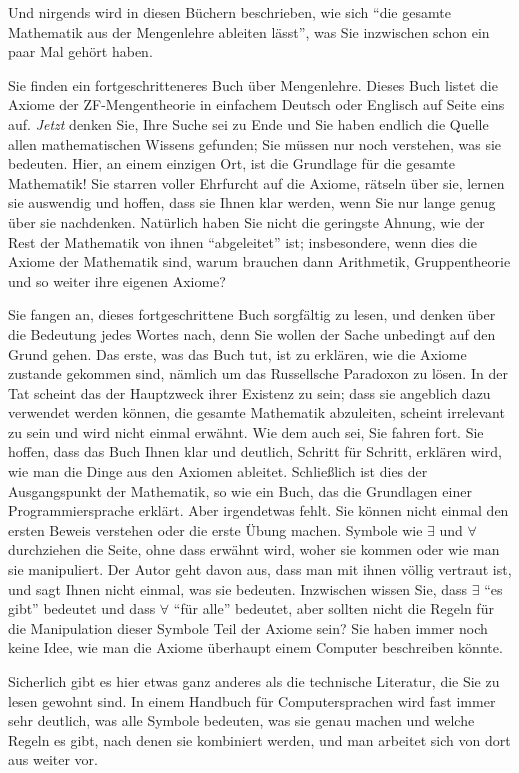 Und nirgends wird in diesen Büchern beschrieben, wie sich "`die gesamte Mathematik aus der Mengenlehre ableiten lässt"', was Sie inzwischen schon ein paar Mal gehört haben.

Sie finden ein fortgeschritteneres Buch über Mengenlehre.  Dieses Buch listet die
Axiome der ZF-Mengentheorie in einfachem Deutsch oder Englisch auf Seite eins auf.  {\em Jetzt} denken Sie, Ihre Suche sei zu Ende und Sie haben endlich die Quelle allen mathematischen Wissens gefunden; Sie müssen nur noch verstehen, was sie bedeuten.  Hier, an einem einzigen Ort, ist die Grundlage für die gesamte Mathematik!  Sie starren voller Ehrfurcht auf die Axiome, rätseln über sie, lernen sie auswendig und hoffen, dass sie Ihnen klar werden, wenn Sie nur lange genug über sie nachdenken.  Natürlich haben Sie nicht die geringste Ahnung, wie der Rest der Mathematik von ihnen "`abgeleitet"' ist; insbesondere, wenn dies die Axiome der Mathematik sind, warum brauchen dann Arithmetik, Gruppentheorie und so weiter ihre eigenen Axiome?
	
Sie fangen an, dieses fortgeschrittene Buch sorgfältig zu lesen, und denken über die Bedeutung jedes Wortes nach, denn Sie wollen der Sache unbedingt auf den Grund gehen.
Das erste, was das Buch tut, ist zu erklären, wie die Axiome zustande gekommen sind, nämlich um das Russellsche Paradoxon zu lösen.  In der Tat scheint das der Hauptzweck ihrer Existenz zu sein; dass sie angeblich dazu verwendet werden können, die gesamte Mathematik abzuleiten, scheint irrelevant zu sein und wird nicht einmal erwähnt.  Wie dem auch sei, Sie fahren fort.  Sie hoffen, dass das Buch Ihnen klar und deutlich, Schritt für Schritt, erklären wird, wie man die Dinge aus den Axiomen ableitet.  Schließlich ist dies der Ausgangspunkt der Mathematik, so wie ein Buch, das die Grundlagen einer Programmiersprache erklärt.  Aber irgendetwas fehlt.  Sie können nicht einmal den ersten Beweis verstehen oder die erste Übung machen.  Symbole wie $\exists$ und $\forall$ durchziehen die Seite, ohne dass erwähnt wird, woher sie kommen oder wie man sie manipuliert. Der Autor geht davon aus, dass man mit ihnen völlig vertraut ist, und sagt Ihnen nicht einmal, was sie bedeuten.  Inzwischen wissen Sie, dass $\exists$ "`es gibt"' bedeutet und dass $\forall$ "`für alle"' bedeutet, aber sollten nicht die Regeln für die Manipulation dieser Symbole Teil der Axiome sein?  Sie haben immer noch keine Idee, wie man die Axiome überhaupt einem Computer beschreiben könnte.
	
Sicherlich gibt es hier etwas ganz anderes als die technische Literatur, die Sie zu lesen gewohnt sind.  In einem Handbuch für Computersprachen wird fast immer sehr deutlich, was alle Symbole bedeuten, was sie genau machen und welche Regeln es gibt, nach denen sie kombiniert werden, und man arbeitet sich von dort aus weiter vor.

